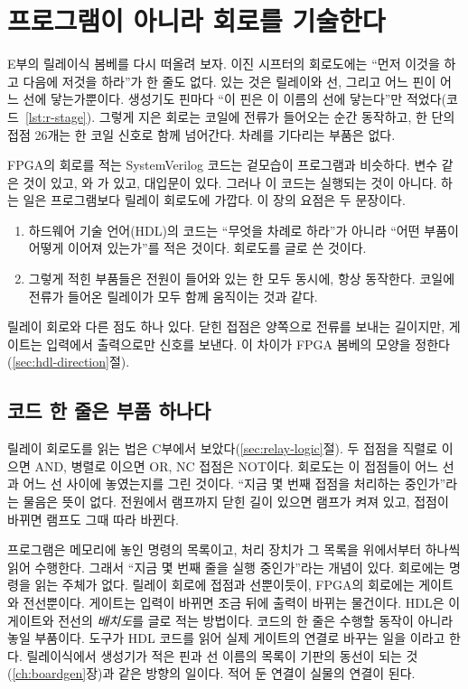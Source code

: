 \chapter{프로그램이 아니라 회로를 기술한다}\label{ch:hdl}

E부의 릴레이식 봄베를 다시 떠올려 보자. 이진 시프터의 회로도에는 ``먼저 이것을 하고 다음에 저것을 하라''가 한
줄도 없다. 있는 것은 릴레이와 선, 그리고 어느 핀이 어느 선에 닿는가뿐이다. 생성기도 핀마다 ``이 핀은 이 이름의
선에 닿는다''만 적었다(코드~\ref{lst:r-stage}). 그렇게 지은 회로는 코일에 전류가 들어오는 순간 동작하고, 한 단의
접점 26개는 한 코일 신호로 함께 넘어간다. 차례를 기다리는 부품은 없다.

FPGA의 회로를 적는 SystemVerilog 코드는 겉모습이 프로그램과 비슷하다. 변수 같은 것이 있고, 와 가
있고, 대입문이 있다. 그러나 이 코드는 실행되는 것이 아니다. 하는 일은 프로그램보다 릴레이 회로도에 가깝다. 이 장의
요점은 두 문장이다.

\begin{keybox}
\begin{enumerate}
\item 하드웨어 기술 언어(HDL)의 코드는 ``무엇을 차례로 하라''가 아니라 ``어떤 부품이 어떻게 이어져
있는가''를 적은 것이다. 회로도를 글로 쓴 것이다.
\item 그렇게 적힌 부품들은 전원이 들어와 있는 한 모두 동시에, 항상 동작한다. 코일에 전류가 들어온 릴레이가
모두 함께 움직이는 것과 같다.
\end{enumerate}
\end{keybox}

릴레이 회로와 다른 점도 하나 있다. 닫힌 접점은 양쪽으로 전류를 보내는 길이지만, 게이트는 입력에서 출력으로만
신호를 보낸다. 이 차이가 FPGA 봄베의 모양을 정한다(\ref{sec:hdl-direction}절).

\section{코드 한 줄은 부품 하나다}

\Relay 릴레이 회로도를 읽는 법은 C부에서 보았다(\ref{sec:relay-logic}절). 두 접점을 직렬로 이으면 AND, 병렬로
이으면 OR, NC 접점은 NOT이다. 회로도는 이 접점들이 어느 선과 어느 선 사이에 놓였는지를 그린 것이다. ``지금 몇
번째 접점을 처리하는 중인가''라는 물음은 뜻이 없다. 전원에서 램프까지 닫힌 길이 있으면 램프가 켜져 있고, 접점이
바뀌면 램프도 그때 따라 바뀐다.

\Why 프로그램은 메모리에 놓인 명령의 목록이고, 처리 장치가 그 목록을 위에서부터 하나씩 읽어 수행한다.
그래서 ``지금 몇 번째 줄을 실행 중인가''라는 개념이 있다. 회로에는 명령을 읽는 주체가 없다. 릴레이 회로에 접점과
선뿐이듯이, FPGA의 회로에는 게이트와 전선뿐이다. 게이트는 입력이 바뀌면 조금 뒤에 출력이 바뀌는 물건이다.
HDL은 이 게이트와 전선의 \emph{배치도}를 글로 적는 방법이다. 코드의 한 줄은 수행할 동작이 아니라 놓일 부품이다.
도구가 HDL 코드를 읽어 실제 게이트의 연결로 바꾸는 일을 이라고 한다. 릴레이식에서 생성기가
적은 핀과 선 이름의 목록이 기판의 동선이 되는 것(\ref{ch:boardgen}장)과 같은 방향의 일이다. 적어 둔 연결이 실물의
연결이 된다.

